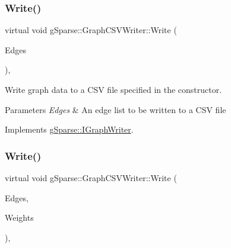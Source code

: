 \mbox{\label{classg_sparse_1_1_graph_c_s_v_writer_a83598d104e12327bf819928239e18ca3}} 
\subsubsection{\texorpdfstring{Write()}{Write()}\hspace{0.1cm}{\footnotesize\ttfamily [2/3]}}
{\footnotesize\ttfamily virtual void g\+Sparse\+::\+Graph\+C\+S\+V\+Writer\+::\+Write (\begin{DoxyParamCaption}\item[{const g\+Sparse\+::\+Edge\+Matrix \&}]{Edges }\end{DoxyParamCaption})\hspace{0.3cm}{\ttfamily [inline]}, {\ttfamily [virtual]}}



Write graph data to a C\+SV file specified in the constructor. 


\begin{DoxyParams}{Parameters}
{\em Edges} & An edge list to be written to a C\+SV file \\
\hline
\end{DoxyParams}


Implements \mbox{\hyperlink{classg_sparse_1_1_i_graph_writer_aa778df52e1595439d724fc873a8dfb52}{g\+Sparse\+::\+I\+Graph\+Writer}}.

\mbox{\label{classg_sparse_1_1_graph_c_s_v_writer_a66e9fe4e8887abca81d6d0090b217950}} 
\subsubsection{\texorpdfstring{Write()}{Write()}\hspace{0.1cm}{\footnotesize\ttfamily [3/3]}}
{\footnotesize\ttfamily virtual void g\+Sparse\+::\+Graph\+C\+S\+V\+Writer\+::\+Write (\begin{DoxyParamCaption}\item[{const g\+Sparse\+::\+Edge\+Matrix \&}]{Edges,  }\item[{const g\+Sparse\+::\+Precision\+Row\+Matrix \&}]{Weights }\end{DoxyParamCaption})\hspace{0.3cm}{\ttfamily [inline]}, {\ttfamily [virtual]}}



